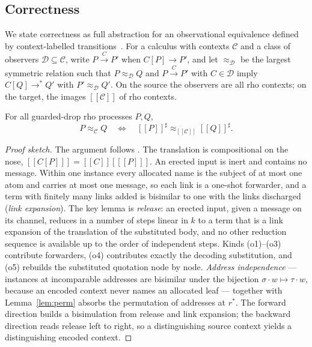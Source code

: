 \documentclass[acmsmall,screen,review,anonymous]{acmart}
\newcommand{\enc}[1]{[\![#1]\!]}
\newcommand{\Ctx}{\mathscr{C}}
\newcommand{\bisim}{\approx}
\newcommand{\red}{\longrightarrow}
\newcommand{\wred}{\longrightarrow^{*}}
\begin{document}
\subsection{Correctness}
\label{sec:correct}

We state correctness as full abstraction for an observational equivalence
defined by context-labelled transitions~\cite{Sewell98,LeiferMilner00}. For a
calculus with contexts $\Ctx$ and a class of observers
$\mathcal{D} \subseteq \Ctx$, write $P \xrightarrow{C} P'$ when $C[P] \red P'$,
and let $\bisim_{\mathcal{D}}$ be the largest symmetric relation such that
$P \bisim_{\mathcal{D}} Q$ and $P \xrightarrow{C} P'$ with $C \in \mathcal{D}$
imply $C[Q] \wred Q'$ with $P' \bisim_{\mathcal{D}} Q'$. On the source the
observers are all rho contexts; on the target, the images $\enc{\Ctx}$ of rho
contexts.

\begin{theorem}
\label{thm:fullabs}
For all guarded-drop rho processes $P,Q$,
\[
  P \bisim_{\Ctx} Q
  \quad\Longleftrightarrow\quad
  \enc{P}^{\sharp} \bisim_{\enc{\Ctx}} \enc{Q}^{\sharp}.
\]
\end{theorem}

\begin{proof}[Proof sketch]
The argument follows \citet{AnonRhocomb}. The translation is compositional on
the nose, $\enc{C[P]} = \enc{C}[\enc{P}]$. An erected input is inert and
contains no message. Within one instance every allocated name is the subject of
at most one atom and carries at most one message, so each link is a one-shot
forwarder, and a term with finitely many links added is bisimilar to one with
the links discharged (\emph{link expansion}). The key lemma is \emph{release}:
an erected input, given a message on its channel, reduces in a number of
steps linear in $k$ to a term that is a link expansion of the translation of
the substituted body, and no other reduction sequence is available up to the
order of independent steps. Kinds (o1)--(o3) contribute forwarders, (o4)
contributes exactly the decoding substitution, and (o5) rebuilds the
substituted quotation node by node. \emph{Address independence} ---
instances at incomparable addresses are bisimilar under the bijection
$\sigma\cdot w \mapsto \tau\cdot w$, because an encoded context never names an
allocated leaf --- together with Lemma~\ref{lem:perm} absorbs the permutation
of addresses at $r^{*}$. The forward direction builds a bisimulation from
release and link expansion; the backward direction reads release left to
right, so a distinguishing source context yields a distinguishing encoded
context.
\end{proof}
\end{document}
